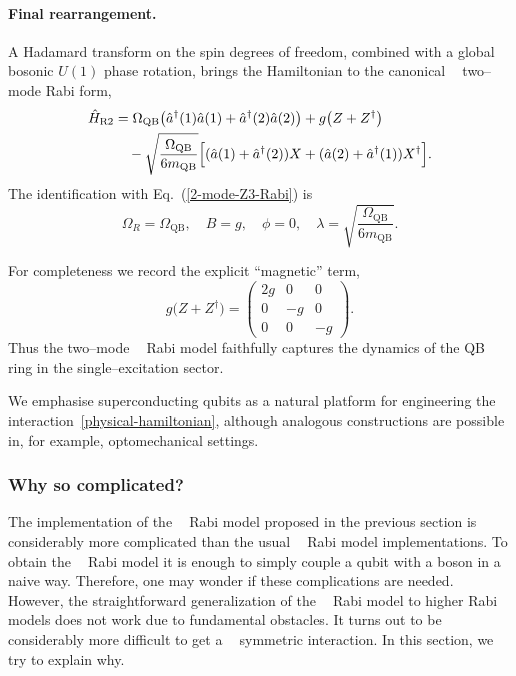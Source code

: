 \documentclass[reprint, aps, prx, amsmath, amssymb, longbibliography, superscriptaddress]{revtex4-2}
\DeclareMathOperator{\Zthree}{\mathbb{Z}_3}
\DeclareMathOperator{\Ztwo}{\mathbb{Z}_2}
\begin{document}
\paragraph{Final rearrangement.}
A Hadamard transform on the spin degrees of freedom, combined with a global
bosonic $U(1)$ phase rotation, brings the Hamiltonian to the canonical
$\Zthree$ two--mode Rabi form,
\begin{equation}
\label{effective-rabi}
  \begin{aligned}
    \hat H_{\text{R}2} &= \Omega_{\text{QB}}
      \bigl( \hat a^{\dagger}(1) \hat a(1) + \hat a^{\dagger}(2) \hat a(2) \bigr)
      + g \bigl( Z + Z^{\dagger} \bigr)
      \\
      &\quad - \sqrt{ \frac{\Omega_{\text{QB}}}{6 m_{\text{QB}}} }
      \Bigl[ ( \hat a(1) + \hat a^{\dagger}(2) ) X
        + ( \hat a(2) + \hat a^{\dagger}(1) ) X^{\dagger} \Bigr].
  \end{aligned}
\end{equation}
The identification with Eq.~(\ref{2-mode-Z3-Rabi}) is
\begin{equation}
\label{QB-RM-parameter-mapping}
  \Omega_R = \Omega_{\text{QB}},
  \quad B = g,
  \quad \phi = 0,
  \quad \lambda = \sqrt{ \frac{\Omega_{\text{QB}}}{6 m_{\text{QB}}} }.
\end{equation}

For completeness we record the explicit ``magnetic'' term,
\begin{equation}
\label{superconducting-magnetic-term}
  g \bigl( Z + Z^{\dagger} \bigr) =
  \begin{pmatrix}
    2 g & 0 & 0 \\
    0 & -g & 0 \\
    0 & 0 & -g
  \end{pmatrix}.
\end{equation}
Thus the two--mode $\Zthree$ Rabi model faithfully captures the dynamics of
the QB ring in the single--excitation sector.

We emphasise superconducting qubits as a natural platform for engineering the
interaction~\eqref{physical-hamiltonian}, although analogous constructions are
possible in, for example, optomechanical settings.


\subsubsection{Why so complicated?}

The implementation of the $\Zthree$ Rabi model proposed in the previous section is considerably more complicated than the usual $\Ztwo$ Rabi model implementations. To obtain the $\Ztwo$ Rabi model it is enough to simply couple a qubit with a boson in a naive way. Therefore, one may wonder if these complications are needed. However, the straightforward generalization of the $\Ztwo$ Rabi model to higher Rabi models does not work due to fundamental obstacles. It turns out to be considerably more difficult to get a $\Zthree$ symmetric interaction. In this section, we try to explain why.
\end{document}

